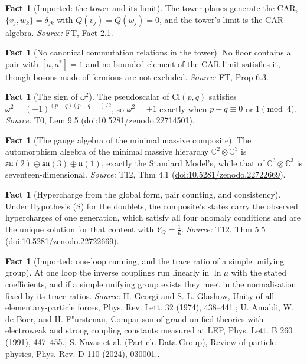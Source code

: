 \documentclass[11pt]{article}
\theoremstyle{definition}
\newtheorem{fact}[theorem]{Fact}
\theoremstyle{plain}
\providecommand{\C}{}\renewcommand{\C}{\mathbb{C}}
\providecommand{\Cl}{}\renewcommand{\Cl}{\mathrm{Cl}}
\providecommand{\su}{}\renewcommand{\su}{\mathfrak{su}}
\providecommand{\uu}{}\renewcommand{\uu}{\mathfrak{u}}
\begin{document}
\begin{fact}[Imported: the tower and its limit]\label{c:field-theory.imported-tower-limit}
The tower planes generate the CAR, $\{v_j, w_k\} = \delta_{jk}$ with $Q(v_j) = Q(w_j) = 0$, and the tower's limit is the CAR algebra.
\emph{Source:} FT, Fact 2.1.
\end{fact}

\begin{fact}[No canonical commutation relations in the tower]\label{c:field-theory.no-canonical-commutation-relations-tower}
No floor contains a pair with $[a, a^*] = 1$ and no bounded element of the CAR limit satisfies it, though bosons made of fermions are not excluded.
\emph{Source:} FT, Prop 6.3.
\end{fact}

\begin{fact}[The sign of $\omega^2$]\label{c:primer.sign}
The pseudoscalar of $\Cl(p,q)$ satisfies $\omega^{2} = (-1)^{(p-q)(p-q-1)/2}$, so $\omega^{2} = +1$ exactly when $p - q \equiv 0$ or $1 \pmod 4$.
\emph{Source:} T0, Lem 9.5 (\href{https://doi.org/10.5281/zenodo.22714501}{doi:10.5281/zenodo.22714501}).
\end{fact}

\begin{fact}[The gauge algebra of the minimal massive composite]\label{c:standard-model.gauge-algebra-minimal-massive-composite}
The automorphism algebra of the minimal massive hierarchy $\C^{2} \otimes \C^{3}$ is $\su(2) \oplus \su(3) \oplus \uu(1)$, exactly the Standard Model's, while that of $\C^{3} \otimes \C^{3}$ is seventeen-dimensional.
\emph{Source:} T12, Thm 4.1 (\href{https://doi.org/10.5281/zenodo.22722669}{doi:10.5281/zenodo.22722669}).
\end{fact}

\begin{fact}[Hypercharge from the global form, pair counting, and consistency]\label{c:standard-model.hypercharge-global-form-pair-counting-consistency}
Under Hypothesis (S) for the doublets, the composite's states carry the observed hypercharges of one generation, which satisfy all four anomaly conditions and are the unique solution for that content with $Y_{Q} = \tfrac16$.
\emph{Source:} T12, Thm 5.5 (\href{https://doi.org/10.5281/zenodo.22722669}{doi:10.5281/zenodo.22722669}).
\end{fact}

\begin{fact}[Imported: one-loop running, and the trace ratio of a simple unifying group]\label{c:standard-model.imported-one-loop-running-trace-ratio}
At one loop the inverse couplings run linearly in $\ln\mu$ with the stated coefficients, and if a simple unifying group exists they meet in the normalisation fixed by its trace ratios.
\emph{Source:} H. Georgi and S. L. Glashow, Unity of all elementary-particle forces, Phys. Rev. Lett. 32 (1974), 438--441.; U. Amaldi, W. de Boer, and H. F"urstenau, Comparison of grand unified theories with electroweak and strong coupling constants measured at LEP, Phys. Lett. B 260 (1991), 447--455.; S. Navas et al. (Particle Data Group), Review of particle physics, Phys. Rev. D 110 (2024), 030001..
\end{fact}
\end{document}

